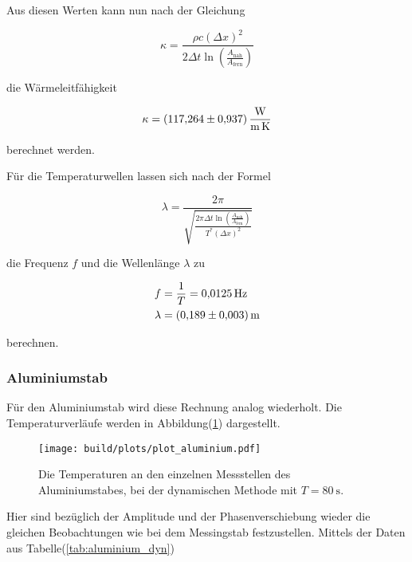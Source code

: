        \noindent Aus diesen Werten kann nun nach der Gleichung

        \begin{equation*}
          \kappa = \frac{\rho c (\Delta x)^2}{2\Delta t \ln \left( \frac{A_{\text{nah}}}{A_{\text{fern}}}\right)} 
        \end{equation*}

        \noindent die Wärmeleitfähigkeit 

        \begin{equation*}
          \kappa = \SI{117.264 \pm 0.937}{\watt\per\metre\per\kelvin}
        \end{equation*}
          
        \noindent berechnet werden.

        \noindent Für die Temperaturwellen lassen sich nach der Formel 

        \begin{equation*}
          \lambda = \frac{2\pi}{\sqrt{\frac{2 \pi \Delta t \ln\left(\frac{A_{\text{nah}}}{A_{\text{fern}}}\right)}{T^* (\Delta x)^2}}}
        \end{equation*}

        \noindent die Frequenz $f$ und die Wellenlänge $\lambda$ zu 

        \begin{align*}
          f &= \frac{1}{T} = \SI{0.0125}{\hertz}\\
          \lambda &= \SI{0.189 \pm 0.003}{\metre}
        \end{align*}

        \noindent berechnen.

      \subsubsection{Aluminiumstab}

        \noindent Für den Aluminiumstab wird diese Rechnung analog wiederholt.
        Die Temperaturverläufe werden in Abbildung(\ref{fig:aluminium_dyn}) dargestellt.

        \begin{figure}[H]
          \centering
          \texttt{[image: build/plots/plot\_aluminium.pdf]}
          \caption{Die Temperaturen an den einzelnen Messstellen des Aluminiumstabes, bei der dynamischen Methode mit $T=\SI{80}{\second}$.}
          \label{fig:aluminium_dyn}
        \end{figure}

        \noindent Hier sind bezüglich der Amplitude und der Phasenverschiebung wieder die gleichen Beobachtungen wie bei dem Messingstab 
        festzustellen.
        Mittels der Daten aus Tabelle(\ref{tab:aluminium_dyn})

